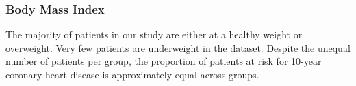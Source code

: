 \documentclass[10pt]{article}
\begin{document}
\begin{figure}[hbt!]
\hspace*{\fill}
\centering
{}\hspace{2em}%
%
\hspace*{\fill}
\end{figure}


\subsubsection*{Body Mass Index}

The majority of patients in our study are either at a healthy weight or overweight. Very few patients are underweight in the dataset. Despite the unequal number of patients per group, the proportion of patients at risk for 10-year coronary heart disease is approximately equal across groups. 

\begin{figure}[hbt!]
\hspace*{\fill}
\centering
{}\hspace{2em}%
%
\hspace*{\fill}
\end{figure}
\end{document}
